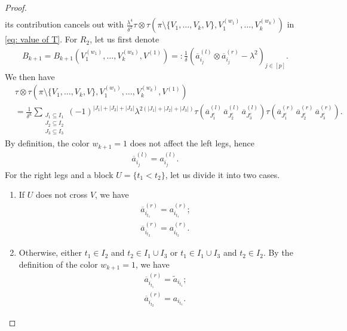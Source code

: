 \documentclass[10pt,a4paper]{amsart}
\begin{document}
\begin{proof}
\begin{align*}
    \end{align*}
    its contribution cancels out with $\frac{\lambda^4}{\delta^2}\tau\otimes \tau\left(\pi\setminus\{V_1,\ldots,V_k,V\},V_1^{(w_1)},\ldots,V_k^{(w_k)}\right)$ in \eqref{eq: value of T}. For $R_2$, let us first denote
    \begin{align*}
        B_{k+1}=B_{k+1}\left(V_1^{(w_1)},\ldots,V_{k}^{(w_k)},V^{(1)}\right)=:\frac{1}{\delta}\left(\overline{a}_{i_j}^{(l)}\otimes \overline{a}_{i_j}^{(r)}-\lambda^2\right)_{j \in [p]}.
    \end{align*}
    We then have
    \begin{align*}
        &\tau\otimes\tau\left(\pi\setminus\{V_1,\ldots,V_k,V\},V_1^{(w_1)},\ldots,V_{k}^{(w_k)},V^{(1)}\right)\\
        &=\frac{1}{\delta^h}\sum_{\substack{J_1 \subseteq I_1\\ J_2 \subseteq I_2\\ J_3 \subseteq I_3}}(-1)^{|J_1|+|J_2|+|J_3|}\lambda^{2(|J_1|+|J_2|+|J_3|)}\tau\left(\overline{a}_{J_1^c}^{(l)}\, \overline{a}_{J_2^c}^{(l)}\, \overline{a}_{J_3^c}^{(l)}\right)\tau\left(\overline{a}_{J_1^c}^{(r)}\, \overline{a}_{J_2^c}^{(r)}\, \overline{a}_{J_3^c}^{(r)}\right).
    \end{align*}
    By definition, the color $w_{k+1}=1$ does not affect the left legs, hence
    \begin{align*}
        \overline{a}_{i_j}^{(l)}=a_{i_j}^{(l)}.
    \end{align*}
    For the right legs and a block $U=\{t_1<t_2\}$, let us divide it into two cases.
    \begin{enumerate}
        \item\label{case 1} If $U$ does not cross $V$, we have
        \begin{align*}
            &\overline{a}_{i_{t_1}}^{(r)}=a_{i_{t_1}}^{(r)};\\
            &\overline{a}_{i_{t_2}}^{(r)}=a_{i_{t_2}}^{(r)}.
        \end{align*}
        \item\label{case 2} Otherwise, either $t_1 \in I_2$ and $t_2 \in I_1\cup I_3$ or $t_1 \in I_1 \cup I_3$ and $t_2 \in I_2$. By the definition of the color $w_{k+1}=1$, we have
        \begin{align*}
            &\overline{a}_{i_{t_1}}^{(r)}=\tilde{a}_{i_{t_1}};\\
            &\overline{a}_{i_{t_2}}^{(r)}=a_{i_{t_1}}.
        \end{align*}
    \end{enumerate}

\end{proof}
\end{document}

